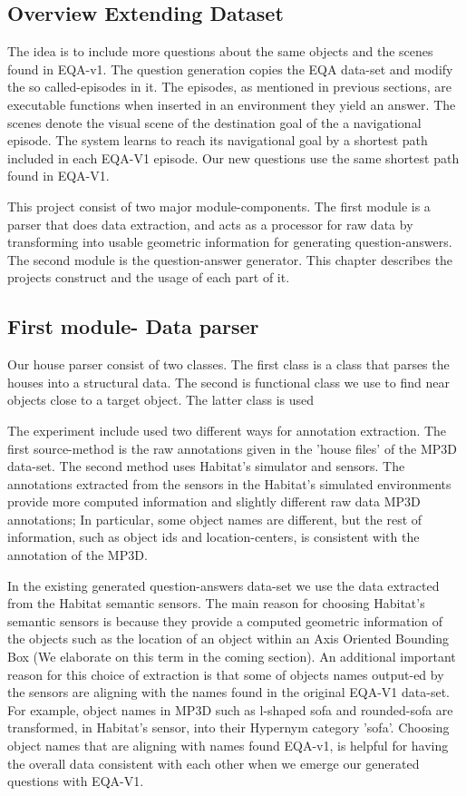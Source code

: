 \subsection{ Overview Extending Dataset}

The idea is to include more questions about the same objects and the scenes found in EQA-v1. The question generation copies the EQA data-set and modify the so called-episodes in it. The episodes, as mentioned in previous sections, are executable functions when inserted in an environment they yield an answer. The scenes denote the visual scene of the destination goal of the a navigational episode. The system learns to reach its navigational goal by a shortest path included in each EQA-V1 episode. Our new questions use the same shortest path found in EQA-V1. 

This project consist of two major module-components. The first module is a parser that does data extraction, and acts as a processor for raw data by transforming into usable geometric information for generating question-answers. The second module is the question-answer generator. This chapter describes the projects construct and the usage of each part of it.  



\subsection{First module- Data parser}

Our house parser consist of two classes. The first class is a class that parses the houses into a structural data. The second is functional class we use to find near objects close to a target object. The latter class is used 

The experiment include used two different ways for annotation extraction. The first source-method is the raw annotations given in the 'house files' of the MP3D data-set. The second method uses Habitat's simulator and sensors. The annotations extracted from the sensors in the Habitat's simulated environments provide more computed information and slightly different raw data MP3D annotations; In particular, some object names are different, but the rest of information, such as object ids and location-centers, is consistent with the annotation of the MP3D. 

In the existing generated question-answers data-set we use the data extracted from the Habitat semantic sensors. The main reason for choosing Habitat's semantic sensors is because they provide a computed geometric information of the objects such as the location of an object within an Axis Oriented Bounding Box (We elaborate on this term in the coming section). An additional important reason for this choice of extraction is that some of  objects names output-ed by the sensors are aligning with the names found in the original EQA-V1 data-set. For example, object names in MP3D such as l-shaped sofa and rounded-sofa are transformed, in Habitat's sensor, into their Hypernym category 'sofa'. Choosing object names that are aligning with names found EQA-v1, is helpful for having the overall data consistent with each other when we emerge our generated questions with EQA-V1. 

